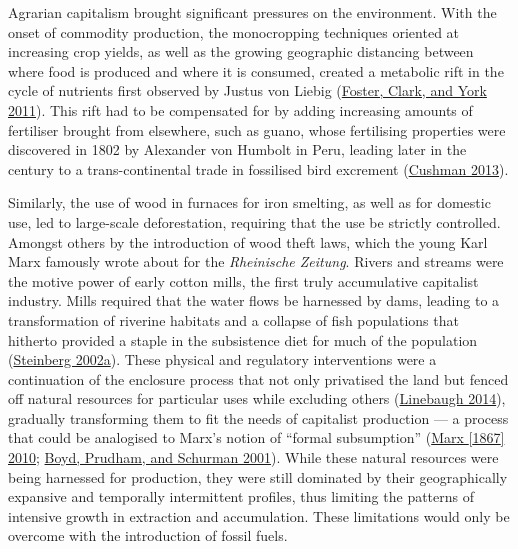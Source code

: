 \documentclass[a4paper, nobind]{templates/ociamthesis}
\begin{document}
Agrarian capitalism brought significant pressures on the environment. With the onset of commodity production, the monocropping techniques oriented at increasing crop yields, as well as the growing geographic distancing between where food is produced and where it is consumed, created a metabolic rift in the cycle of nutrients first observed by Justus von Liebig (\protect\hyperlink{ref-foster_ecological_2011}{Foster, Clark, and York 2011}). This rift had to be compensated for by adding increasing amounts of fertiliser brought from elsewhere, such as guano, whose fertilising properties were discovered in 1802 by Alexander von Humbolt in Peru, leading later in the century to a trans-continental trade in fossilised bird excrement (\protect\hyperlink{ref-cushman_guano_2013}{Cushman 2013}).

Similarly, the use of wood in furnaces for iron smelting, as well as for domestic use, led to large-scale deforestation, requiring that the use be strictly controlled. Amongst others by the introduction of wood theft laws, which the young Karl Marx famously wrote about for the \emph{Rheinische Zeitung}. Rivers and streams were the motive power of early cotton mills, the first truly accumulative capitalist industry. Mills required that the water flows be harnessed by dams, leading to a transformation of riverine habitats and a collapse of fish populations that hitherto provided a staple in the subsistence diet for much of the population (\protect\hyperlink{ref-steinberg_earth_2002}{Steinberg 2002a}). These physical and regulatory interventions were a continuation of the enclosure process that not only privatised the land but fenced off natural resources for particular uses while excluding others (\protect\hyperlink{ref-linebaugh_stop_2014}{Linebaugh 2014}), gradually transforming them to fit the needs of capitalist production --- a process that could be analogised to Marx's notion of ``formal subsumption'' (\protect\hyperlink{ref-marx_capital_1867}{Marx {[}1867{]} 2010}; \protect\hyperlink{ref-boyd_industrial_2001}{Boyd, Prudham, and Schurman 2001}). While these natural resources were being harnessed for production, they were still dominated by their geographically expansive and temporally intermittent profiles, thus limiting the patterns of intensive growth in extraction and accumulation. These limitations would only be overcome with the introduction of fossil fuels.
\end{document}
